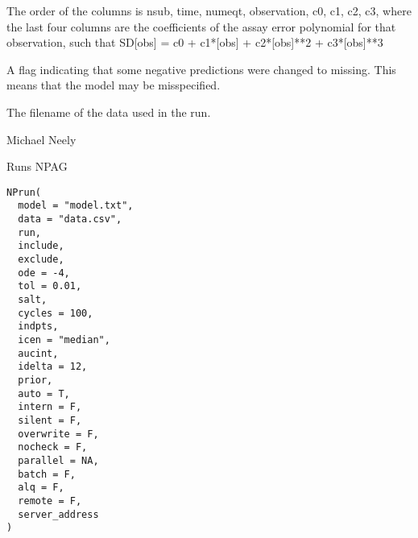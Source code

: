 \documentclass[a4paper]{book}
\begin{document}
\begin{Value}
\begin{ldescription}
The order of the columns is nsub, time, numeqt, observation, c0, c1, c2, c3, where the last
four columns are the coefficients of the assay error polynomial for that observation, such that
SD[obs] = c0 + c1*[obs] + c2*[obs]**2 + c3*[obs]**3
\item[\code{negflag }] A flag indicating that some negative predictions were changed to missing.
This means that the model may be misspecified.
\item[\code{mdata }] The filename of the data used in the run.
\end{ldescription}
\end{Value}
%
\begin{Author}\relax
Michael Neely
\end{Author}
%
\begin{Description}\relax
Runs NPAG
\end{Description}
%
\begin{Usage}
\begin{verbatim}
NPrun(
  model = "model.txt",
  data = "data.csv",
  run,
  include,
  exclude,
  ode = -4,
  tol = 0.01,
  salt,
  cycles = 100,
  indpts,
  icen = "median",
  aucint,
  idelta = 12,
  prior,
  auto = T,
  intern = F,
  silent = F,
  overwrite = F,
  nocheck = F,
  parallel = NA,
  batch = F,
  alq = F,
  remote = F,
  server_address
)
\end{verbatim}
\end{Usage}
%
\end{document}
